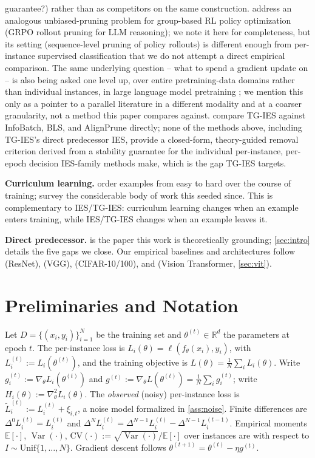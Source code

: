 \documentclass{article}
\theoremstyle{plain}
\theoremstyle{definition}
\theoremstyle{remark}
\DeclareMathOperator{\Var}{Var}
\newcommand{\CV}{\mathrm{CV}}
\newcommand{\R}{\mathbb{R}}
\begin{document}
guarantee?) rather than as competitors on the same construction. \citet{zhu2026dppo} address an analogous unbiased-pruning problem for group-based RL policy optimization (GRPO rollout pruning for LLM reasoning); we note it here for completeness, but its setting (sequence-level pruning of policy rollouts) is different enough from per-instance supervised classification that we do not attempt a direct empirical comparison. The same underlying question -- what to spend a gradient update on -- is also being asked one level up, over entire pretraining-data domains rather than individual instances, in large language model pretraining \citep{xie2023doremi}; we mention this only as a pointer to a parallel literature in a different modality and at a coarser granularity, not a method this paper compares against.  compare TG-IES against InfoBatch, BLS, and AlignPrune directly; none of the methods above, including TG-IES's direct predecessor IES, provide a closed-form, theory-guided removal criterion derived from a stability guarantee for the individual per-instance, per-epoch decision IES-family methods make, which is the gap TG-IES targets.

\textbf{Curriculum learning.} \citet{bengio2009curriculum} order examples from easy to hard over the course of training; \citet{soviany2022curriculum} survey the considerable body of work this seeded since. This is complementary to IES/TG-IES: curriculum learning changes when an example enters training, while IES/TG-IES changes when an example leaves it.

\textbf{Direct predecessor.} \citet{yuan2025instance} is the paper this work is theoretically grounding; \cref{sec:intro} details the five gaps we close. Our empirical baselines and architectures follow \citet{he2016deep} (ResNet), \citet{simonyan2015very} (VGG), \citet{krizhevsky2009learning} (CIFAR-10/100), and \citet{dosovitskiy2021image} (Vision Transformer, \cref{sec:vit}).

\section{Preliminaries and Notation}
\label{sec:prelim}

Let $D = \{(x_i,y_i)\}_{i=1}^N$ be the training set and $\theta^{(t)} \in \R^d$ the parameters at epoch $t$. The per-instance loss is $L_i(\theta) = \ell(f_\theta(x_i),y_i)$, with $L_i^{(t)} := L_i(\theta^{(t)})$, and the training objective is $L(\theta) = \frac1N\sum_i L_i(\theta)$. Write $g_i^{(t)} := \nabla_\theta L_i(\theta^{(t)})$ and $g^{(t)} := \nabla_\theta L(\theta^{(t)}) = \frac1N\sum_i g_i^{(t)}$; write $H_i(\theta) := \nabla_\theta^2 L_i(\theta)$. The \emph{observed} (noisy) per-instance loss is $\tilde L_i^{(t)} := L_i^{(t)} + \xi_{i,t}$, a noise model formalized in \cref{ass:noise}. Finite differences are $\Delta^0 L_i^{(t)} = L_i^{(t)}$ and $\Delta^N L_i^{(t)} = \Delta^{N-1}L_i^{(t)} - \Delta^{N-1}L_i^{(t-1)}$. Empirical moments $\mathbb E[\cdot]$, $\Var(\cdot)$, $\CV(\cdot) := \sqrt{\Var(\cdot)}/\mathbb E[\cdot]$ over instances are with respect to $I \sim \mathrm{Unif}\{1,\dots,N\}$. Gradient descent follows $\theta^{(t+1)} = \theta^{(t)} - \eta g^{(t)}$.
\end{document}
